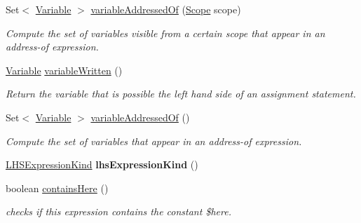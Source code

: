 \begin{DoxyCompactItemize}
Set$<$ \hyperlink{interfaceedu_1_1udel_1_1cis_1_1vsl_1_1civl_1_1model_1_1IF_1_1variable_1_1Variable}{Variable} $>$ \hyperlink{classedu_1_1udel_1_1cis_1_1vsl_1_1civl_1_1model_1_1common_1_1expression_1_1CommonDereferenceExpression_a91dd48fad58efe7679eafb22a282c6d4}{variable\+Addressed\+Of} (\hyperlink{interfaceedu_1_1udel_1_1cis_1_1vsl_1_1civl_1_1model_1_1IF_1_1Scope}{Scope} scope)
\begin{DoxyCompactList}\small\item\em Compute the set of variables visible from a certain scope that appear in an address-\/of expression. \end{DoxyCompactList}\item 
\hyperlink{interfaceedu_1_1udel_1_1cis_1_1vsl_1_1civl_1_1model_1_1IF_1_1variable_1_1Variable}{Variable} \hyperlink{classedu_1_1udel_1_1cis_1_1vsl_1_1civl_1_1model_1_1common_1_1expression_1_1CommonDereferenceExpression_a482fe58903d263631de6eb1fc9012287}{variable\+Written} ()
\begin{DoxyCompactList}\small\item\em Return the variable that is possible the left hand side of an assignment statement. \end{DoxyCompactList}\item 
Set$<$ \hyperlink{interfaceedu_1_1udel_1_1cis_1_1vsl_1_1civl_1_1model_1_1IF_1_1variable_1_1Variable}{Variable} $>$ \hyperlink{classedu_1_1udel_1_1cis_1_1vsl_1_1civl_1_1model_1_1common_1_1expression_1_1CommonDereferenceExpression_a20e083106d924c715a0301a9935c0b10}{variable\+Addressed\+Of} ()
\begin{DoxyCompactList}\small\item\em Compute the set of variables that appear in an address-\/of expression. \end{DoxyCompactList}\item 
\hypertarget{classedu_1_1udel_1_1cis_1_1vsl_1_1civl_1_1model_1_1common_1_1expression_1_1CommonDereferenceExpression_a12d8685bbd03ce064d9c3333cc067237}{}\hyperlink{enumedu_1_1udel_1_1cis_1_1vsl_1_1civl_1_1model_1_1IF_1_1expression_1_1LHSExpression_1_1LHSExpressionKind}{L\+H\+S\+Expression\+Kind} {\bfseries lhs\+Expression\+Kind} ()\label{classedu_1_1udel_1_1cis_1_1vsl_1_1civl_1_1model_1_1common_1_1expression_1_1CommonDereferenceExpression_a12d8685bbd03ce064d9c3333cc067237}

\item 
boolean \hyperlink{classedu_1_1udel_1_1cis_1_1vsl_1_1civl_1_1model_1_1common_1_1expression_1_1CommonDereferenceExpression_a6838b2bb33fbf7b903f0b762d58da359}{contains\+Here} ()
\begin{DoxyCompactList}\small\item\em checks if this expression contains the constant \$here. \end{DoxyCompactList}\end{DoxyCompactItemize}

